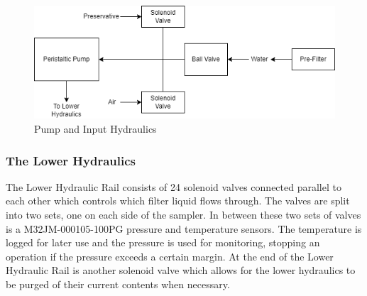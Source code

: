 \documentclass[11pt, letterpaper]{article}
\begin{document}
\begin{figure}[H]
	\centering
	\includegraphics[scale=0.75]{./Assets/PolyWAG_HX_HD_InHydr.png}
	\caption{Pump and Input Hydraulics}
\end{figure}

\subsubsection{The Lower Hydraulics}
The Lower Hydraulic Rail consists of 24 solenoid valves connected parallel to each other which controls which filter liquid flows through. The valves are split into two sets, one on each side of the sampler. In between these two sets of valves is a M32JM-000105-100PG pressure and temperature sensors. The temperature is logged for later use and the pressure is used for monitoring, stopping an operation if the pressure exceeds a certain margin. At the end of the Lower Hydraulic Rail is another solenoid valve which allows for the lower hydraulics to be purged of their current contents when necessary.
\end{document}
